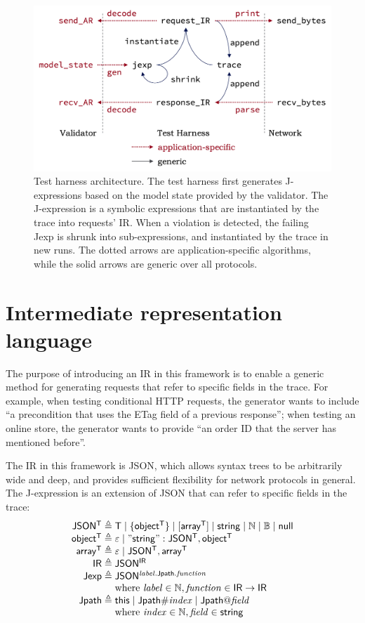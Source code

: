 \begin{figure}
  \includegraphics[width=.8\textwidth]{figures/shrink}
  \caption{Test harness architecture.  The test harness first generates
    J-expressions based on the model state provided by the validator.  The
    J-expression is a symbolic expressions that are instantiated by the trace
    into requests' IR.  When a violation is detected, the failing Jexp is shrunk
    into sub-expressions, and instantiated by the trace in new runs.  The dotted
    arrows are application-specific algorithms, while the solid arrows are
    generic over all protocols.}
  \label{fig:shrink}
\end{figure}

\section{Intermediate representation language}
The purpose of introducing an IR in this framework is to enable a generic method
for generating requests that refer to specific fields in the trace.  For
example, when testing conditional HTTP requests, the generator wants to include
``a precondition that uses the ETag field of a previous response''; when testing
an online store, the generator wants to provide ``an order ID that the server
has mentioned before''.

The IR in this framework is JSON, which allows syntax trees to be arbitrarily
wide and deep, and provides sufficient flexibility for network protocols in
general.  The J-expression is an extension of JSON that can refer to specific
fields in the trace:
\[\begin{array}{r@{\;}l}
\mathsf{JSON^T}\triangleq&\mathsf T\mid\{\mathsf{object^T}\}\mid[\mathsf{array^T}]\mid\mathsf{string}\mid\Nat\mid\Bool\mid\mathsf{null}\\
\mathsf{object^T}\triangleq&\nil\mid\mathsf{"string": JSON^T,object^T}\\
\mathsf{array^T}\triangleq&\nil\mid\mathsf{JSON^T,array^T}\\
\mathsf{IR}\triangleq&\mathsf{JSON^{IR}}\\
\mathsf{Jexp}\triangleq&\mathsf{JSON^{\Jref{\mathit{label}}{\mathsf{Jpath}}{\mathit{function}}}}\\
&\text{where }\mathit{label}\in\Nat,\mathit{function}\in\mathsf{IR}\to\mathsf{IR}\\
\Jpath\triangleq&\This\mid\Jpath\Number\mathit{index}\mid\Jpath\At\mathit{field}\\
&\text{where }\mathit{index}\in\Nat,\mathit{field}\in\mathsf{string}
\end{array}\]

